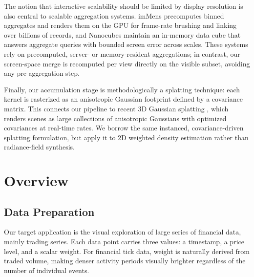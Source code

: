 \documentclass[10pt,conference]{IEEEtran}
\begin{document}
The notion that interactive scalability should be limited by display resolution is also central to scalable aggregation systems. imMens \cite{10.1111/cgf.12129} precomputes binned aggregates and renders them on the GPU for frame-rate brushing and linking over billions of records, and Nanocubes \cite{10.1109/TVCG.2013.179} maintain an in-memory data cube that answers aggregate queries with bounded screen error across scales. These systems rely on precomputed, server- or memory-resident aggregations; in contrast, our screen-space merge is recomputed per view directly on the visible subset, avoiding any pre-aggregation step.

Finally, our accumulation stage is methodologically a splatting technique: each kernel is rasterized as an anisotropic Gaussian footprint defined by a covariance matrix. This connects our pipeline to recent 3D Gaussian splatting \cite{10.1145/3592433}, which renders scenes as large collections of anisotropic Gaussians with optimized covariances at real-time rates. We borrow the same instanced, covariance-driven splatting formulation, but apply it to 2D weighted density estimation rather than radiance-field synthesis.



\section{Overview}
\label{sec:data}

\subsection{Data Preparation}

Our target application is the visual exploration of large series of financial data, mainly trading series. Each data point carries three values: a timestamp, a price level, and a scalar weight. For financial tick data, weight is naturally derived from traded volume, making denser activity periods visually brighter regardless of the number of individual events.

\end{document}
